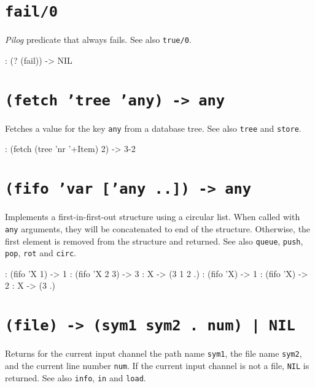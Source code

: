  
\section*{\texttt{fail/0}}
\label{sec:func-ref-F-fail/0}


\emph{Pilog} predicate that always fails. See also
\texttt{true/0}.


\begin{wideverbatim}
:  (? (fail))
-> NIL
\end{wideverbatim}

 
\section*{\texttt{(fetch 'tree 'any) -> any}}
\label{sec:func-ref-F-(fetch 'tree 'any) -> any}


Fetches a value for the key \texttt{any} from a database tree. See also \texttt{tree}
and \texttt{store}.


\begin{wideverbatim}
: (fetch (tree 'nr '+Item) 2)
-> {3-2}
\end{wideverbatim}

 
\section*{\texttt{(fifo 'var ['any ..]) -> any}}
\label{sec:func-ref-F-(fifo 'var ['any ..]) -> any}


Implements a first-in-first-out structure using a circular list. When
called with \texttt{any} arguments, they will be concatenated to end of the
structure. Otherwise, the first element is removed from the structure
and returned. See also \texttt{queue}, \texttt{push}, \texttt{pop}, \texttt{rot} and \texttt{circ}.


\begin{wideverbatim}
: (fifo 'X 1)
-> 1
: (fifo 'X 2 3)
-> 3
: X
-> (3 1 2 .)
: (fifo 'X)
-> 1
: (fifo 'X)
-> 2
: X
-> (3 .)
\end{wideverbatim}

 
\section*{\texttt{(file) -> (sym1 sym2 . num) | NIL}}
\label{sec:func-ref-F-(file) -> (sym1 sym2 . num) | NIL}


Returns for the current input channel the path name \texttt{sym1}, the file
name \texttt{sym2}, and the current line number \texttt{num}. If the current input
channel is not a file, \texttt{NIL} is returned. See also \texttt{info}, \texttt{in} and
\texttt{load}.


